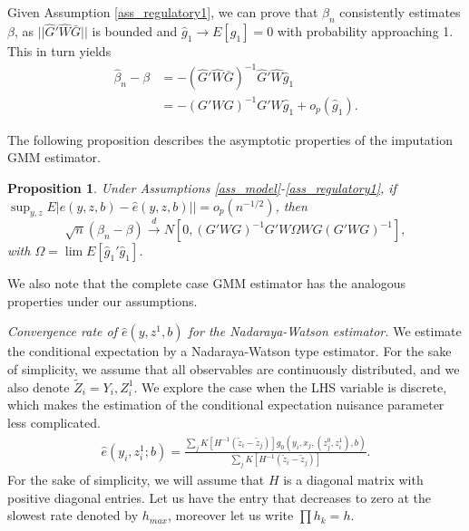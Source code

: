 \documentclass{article}
\newtheorem{proposition}{Proposition}
\theoremstyle{definition}
\theoremstyle{remark}
\begin{document}
Given Assumption \ref{ass_regulatory1}, we can prove that $\hat{\beta}_n$ consistently estimates $\beta$, as $||\hat{G}'\hat{W}\bar{G}||$ is bounded and $\hat{g}_1 \rightarrow E[g_1]=0$ with probability approaching 1. This in turn yields
\begin{align}
    \hat{\beta}_n -\beta&=-(\hat{G}'\hat{W}\bar{G})^{-1} \hat{G}'\hat{W} \hat{g}_1 \\
    &= -(G'WG)^{-1}G'W \hat{g}_1 + o_p(\hat{g}_1).\nonumber
\end{align}

The following proposition describes the asymptotic properties of the imputation GMM estimator.
\begin{proposition}\label{prop_asympTheory}
	Under Assumptions \ref{ass_model}-\ref{ass_regulatory1}, if $\sup_{y,z}E|e(y, z,b)-\hat{e}(y,z,b)||=o_p(n^{-1/2})$, then
	\[\sqrt{n}(\beta_n-\beta) \stackrel{d}{\rightarrow} N[0, (G'WG)^{-1}G'W \Omega W G (G'WG)^{-1}],
	\]
	with $\Omega= \lim E[\hat{g}_1'\hat{g}_1]$.
\end{proposition}
We also note that the complete case GMM estimator has the analogous properties under our assumptions.

\emph{Convergence rate of $\hat{e}(y,z^1,b)$ for the Nadaraya-Watson estimator.}
We estimate the conditional expectation by a Nadaraya-Watson type estimator. For the sake of simplicity, we assume that all observables are continuously distributed, and we also denote $\tilde{Z}_i = Y_i, Z_i^1$. We explore the case when the LHS variable is discrete, which makes the estimation of the conditional expectation nuisance parameter less complicated. 
\begin{align}
    \hat{e}(y_i, z_i^1; b)= \frac{\sum_j K[H^{-1}(\tilde{z}_i-\tilde{z}_j)] g_0(y_i, x_j, (z_j^0, z_i^1), b)}{\sum_j K[H^{-1}(\tilde{z}_i-\tilde{z}_j)]}.
\end{align}
For the sake of simplicity, we will assume that $H$ is a diagonal matrix with positive diagonal entries. Let us have the entry that decreases to zero at the slowest rate denoted by $h_{max}$, moreover let us write $\prod h_k= h$.
\end{document}
